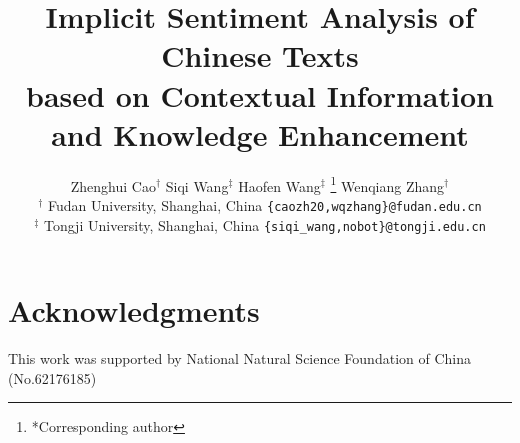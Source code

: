 \documentclass[11pt]{article}
\title{Implicit Sentiment Analysis of Chinese Texts \\ based on Contextual Information and Knowledge Enhancement}
\author{ Zhenghui Cao$^{\dagger}$
\hspace{2em}  Siqi Wang$^{\ddagger}$
\hspace{2em}  Haofen Wang$^{\ddagger}$ \thanks{*Corresponding author}
\hspace{2em}  Wenqiang Zhang$^{\dagger}$ \\
$^{\dagger}$ Fudan University, Shanghai, China \hspace{1em}
\texttt{\small\{caozh20,wqzhang\}@fudan.edu.cn}\\
$^{\ddagger}$ Tongji University, Shanghai, China \hspace{1em}
\texttt{\small \{siqi\_wang,nobot\}@tongji.edu.cn}}
\begin{document}
\maketitle









\section{Acknowledgments}
This work was supported by National Natural Science Foundation of China (No.62176185)

%
%
\end{document}
